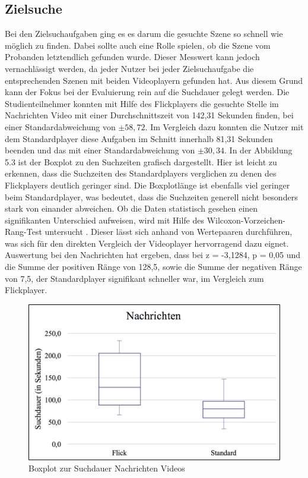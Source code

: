 \documentclass[11pt,a4paper]{report}
\begin{document}
\subsection{Zielsuche}

Bei den Zielsuchaufgaben ging es es darum die gesuchte Szene so schnell wie möglich zu finden. Dabei sollte auch eine Rolle spielen, ob die Szene vom Probanden letztendlich gefunden wurde. Dieser Messwert kann jedoch vernachlässigt werden, da jeder Nutzer bei jeder Zielsuchaufgabe die entsprechenden Szenen mit beiden Videoplayern gefunden hat. Aus diesem Grund kann der Fokus bei der Evaluierung rein auf die Suchdauer gelegt werden. Die Studienteilnehmer konnten mit Hilfe des Flickplayers die gesuchte Stelle im Nachrichten Video mit einer Durchschnittszeit von 142,31 Sekunden finden, bei einer Standardabweichung von  $\pm 58,72$. Im Vergleich dazu konnten die Nutzer mit dem Standardplayer diese Aufgaben im Schnitt innerhalb 81,31 Sekunden beenden und das mit einer Standardabweichung von $\pm 30,34$. In der Abbildung 5.3 ist der Boxplot zu den Suchzeiten grafisch dargestellt. Hier ist leicht zu erkennen, dass die Suchzeiten des Standardplayers verglichen zu denen des Flickplayers deutlich geringer sind. Die Boxplotlänge ist ebenfalls viel geringer beim Standardplayer, was bedeutet, dass die Suchzeiten generell nicht besonders stark von einander abweichen. Ob die Daten statistisch gesehen einen signifikanten Unterschied aufweisen, wird mit Hilfe des Wilcoxon-Vorzeichen-Rang-Test untersucht \cite{rosner2006wilcoxon}. Dieser lässt sich anhand von Wertepaaren durchführen, was sich für den direkten Vergleich der Videoplayer hervorragend dazu eignet. Auswertung bei den Nachrichten hat ergeben, dass bei z = -3,1284, p = 0,05 und die Summe der positiven Ränge von 128,5, sowie die Summe der negativen Ränge von 7,5, der Standardplayer signifikant schneller war, im Vergleich zum Flickplayer.
\begin{figure}[h]
\begin{center}
\includegraphics[scale=0.9]{./images/33.png}
\caption{Boxplot zur Suchdauer Nachrichten Videos}
\label{boxplot_nachrichten}
\end{center}
\end{figure}
\end{document}
